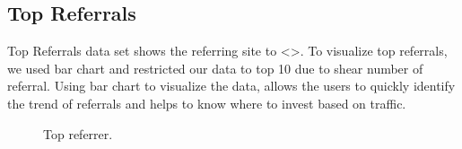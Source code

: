 \subsection{Top Referrals} \label{viztoprefs}
Top Referrals data set shows the referring site to <>. To visualize
top referrals, we used bar chart and restricted our data to top 10 due
to shear number of referral. Using bar chart to visualize the data,
allows the users to quickly identify the trend of referrals and helps
to know where to invest based on traffic. 

\begin{figure}
\centering
{}
\caption{Top referrer.}
\label{fig:topreferrer}
\end{figure}
